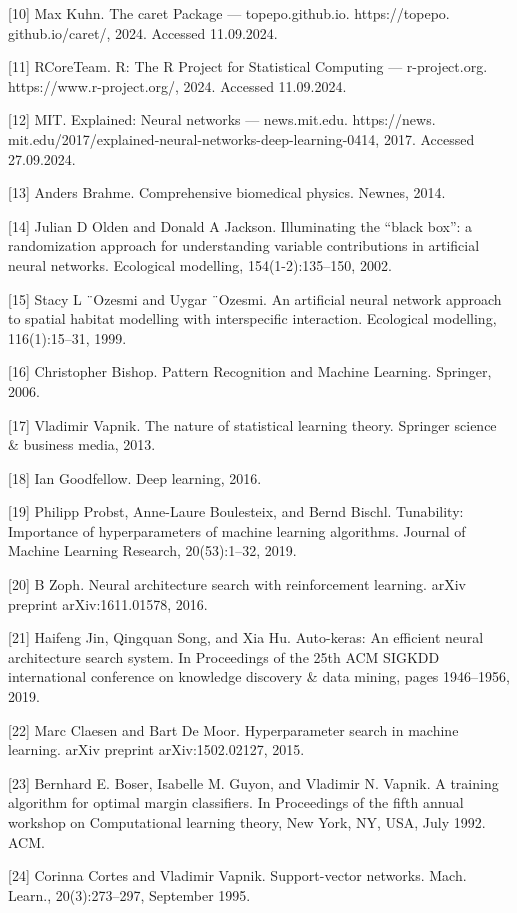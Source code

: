 \documentclass[preprint,12pt]{elsarticle}
\begin{document}
[10] Max Kuhn. The caret Package — topepo.github.io. https://topepo. github.io/caret/, 2024. Accessed 11.09.2024. 

[11] RCoreTeam. R: The R Project for Statistical Computing — r-project.org. https://www.r-project.org/, 2024. Accessed 11.09.2024. 

[12] MIT. Explained: Neural networks — news.mit.edu. https://news. mit.edu/2017/explained-neural-networks-deep-learning-0414, 2017. Accessed 27.09.2024. 

[13] Anders Brahme. Comprehensive biomedical physics. Newnes, 2014. 

[14] Julian D Olden and Donald A Jackson. Illuminating the “black box”: a randomization approach for understanding variable contributions in artificial neural networks. Ecological modelling, 154(1-2):135–150, 2002. 

[15] Stacy L ¨Ozesmi and Uygar ¨Ozesmi. An artificial neural network approach to spatial habitat modelling with interspecific interaction. Ecological modelling, 116(1):15–31, 1999. 

[16] Christopher Bishop. Pattern Recognition and Machine Learning. Springer, 2006. 

[17] Vladimir Vapnik. The nature of statistical learning theory. Springer science & business media, 2013. 

[18] Ian Goodfellow. Deep learning, 2016. 

[19] Philipp Probst, Anne-Laure Boulesteix, and Bernd Bischl. Tunability: Importance of hyperparameters of machine learning algorithms. Journal of Machine Learning Research, 20(53):1–32, 2019. 

[20] B Zoph. Neural architecture search with reinforcement learning. arXiv preprint arXiv:1611.01578, 2016. 

[21] Haifeng Jin, Qingquan Song, and Xia Hu. Auto-keras: An efficient neural architecture search system. In Proceedings of the 25th ACM SIGKDD international conference on knowledge discovery & data mining, pages 1946–1956, 2019. 

[22] Marc Claesen and Bart De Moor. Hyperparameter search in machine learning. arXiv preprint arXiv:1502.02127, 2015. 

[23] Bernhard E. Boser, Isabelle M. Guyon, and Vladimir N. Vapnik. A training algorithm for optimal margin classifiers. In Proceedings of the fifth annual workshop on Computational learning theory, New York, NY, USA, July 1992. ACM. 

[24] Corinna Cortes and Vladimir Vapnik. Support-vector networks. Mach. Learn., 20(3):273–297, September 1995. 
\end{document}
